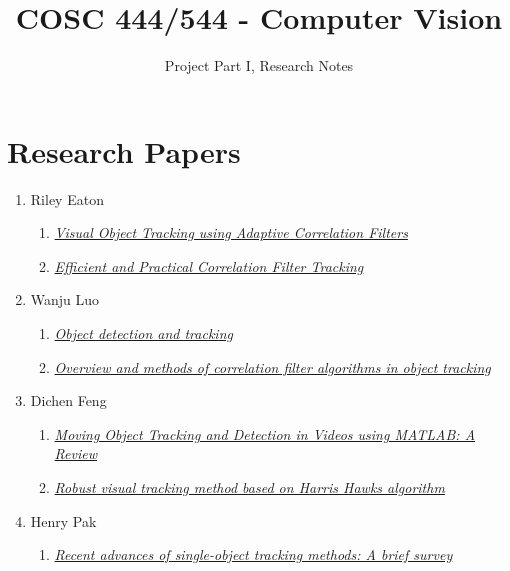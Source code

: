 \documentclass{article}
\title{COSC 444/544 - Computer Vision}
\author{Project Part I, Research Notes}
\begin{document}
\maketitle

\section*{Research Papers}

\begin{enumerate}
  \item Riley Eaton
    \begin{enumerate}[label*=\arabic*.]
      \item \textit{\href{https://typeset.io/papers/visual-object-tracking-using-adaptive-correlation-filters-1xuhtpe358}{Visual Object Tracking using Adaptive Correlation Filters}}
      \item \textit{\href{https://www.mdpi.com/1424-8220/21/3/790}{Efficient and Practical Correlation Filter Tracking}}
    \end{enumerate}
  \item Wanju Luo
    \begin{enumerate}[label*=\arabic*.]
      \item \textit{\href{https://www.sciencedirect.com/science/article/pii/B9780323857871000166?via\%3Dihub}{Object detection and tracking}}
      \item \textit{\href{https://link.springer.com/article/10.1007/s40747-020-00161-4}{Overview and methods of correlation filter algorithms in object tracking}}
    \end{enumerate}
  \item Dichen Feng
    \begin{enumerate}[label*=\arabic*.]
      \item \textit{\href{https://jst.org.in/index.php/pub/article/view/743/669}{Moving Object Tracking and Detection in Videos using MATLAB: A Review}}
      \item \textit{\href{https://www.semanticscholar.org/paper/Robust-visual-tracking-method-based-on-Harris-Hawks-Charef-Khodja-Abida/e945f79be12f7d64df3d5ef69256e2a0eaec1f03}{Robust visual tracking method based on Harris Hawks algorithm}}
    \end{enumerate}
  \item Henry Pak
    \begin{enumerate}[label*=\arabic*.]
      \item \textit{\href{https://www.sciencedirect.com/science/article/pii/S0925231221007220}{Recent advances of single-object tracking methods: A brief survey}}

\end{enumerate}
\end{enumerate}
\end{document}
